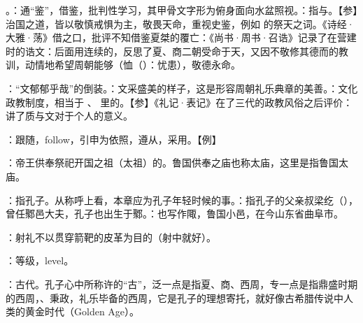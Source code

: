 {
\item {}。：通“鉴”，借鉴，批判性学习，其甲骨文字形为俯身面向水盆照视。：指与。【参】治国之道，皆以敬慎戒惧为主，敬畏天命，重视史鉴，例如  的祭天之词。《诗经·大雅·荡》借之口，批评不知借鉴夏桀的覆亡：《尚书·周书·召诰》记录了在营建时的诰文：后面用连续的，反思了夏、商二朝受命于天，又因不敬修其德而的教训，动情地希望周朝能够（恤（）：忧患），敬德永命。
\item {}：“文郁郁乎哉”的倒装。：文采盛美的样子，这是形容周朝礼乐典章的美善。：文化政教制度，相当于 、 里的。【参】《礼记·表记》在了三代的政教风俗之后评价：  讲了质与文对于个人的意义。

\item {}：跟随，follow，引申为依照，遵从，采用。【例】 
}
{}


{
\item {}：帝王供奉祭祀开国之祖（太祖）的。鲁国供奉之庙也称太庙，这里是指鲁国太庙。
\item {}：指孔子。从称呼上看，本章应为孔子年轻时候的事。：指孔子的父亲叔梁纥（），曾任鄹邑大夫，孔子也出生于鄹。：也写作陬，鲁国小邑，在今山东省曲阜市。
}
{}


{
\item {}：射礼不以贯穿箭靶的皮革为目的（射中就好）。
\item {}：等级，level。

\item {}：古代。孔子心中所称许的“古”，泛一点是指夏、商、西周，专一点是指鼎盛时期的西周，、秉政，礼乐毕备的西周，它是孔子的理想寄托，就好像古希腊传说中人类的黄金时代（Golden Age）。
}
{}  %


